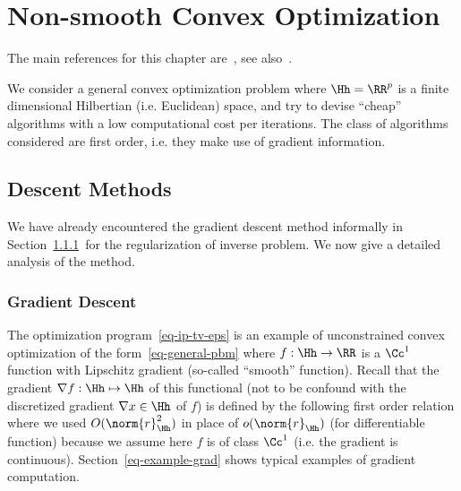
\chapter{Non-smooth Convex Optimization}
\label{chap-conv-duality}

The main references for this chapter are~\cite{chambolle2010introduction,chambolle2016introduction,boyd2004convex}, see also~\cite{parikh2014proximal,boyd2011distributed,beck2014introduction}. 

We consider a general convex optimization problem
where $\Hh=\RR^p$ is a finite dimensional Hilbertian (i.e. Euclidean) space, 
and try to devise ``cheap'' algorithms with a low computational cost per iterations. The class of algorithms considered are first order, i.e. they make use of gradient information. 


\section{Descent Methods}
\label{sec-grad-descent}

We have already encountered the gradient descent method informally in Section~\ref{} for the regularization of inverse problem. We now give a detailed analysis of the method.

\subsection{Gradient Descent}

The optimization program~\eqref{eq-ip-tv-eps} is an example of unconstrained convex optimization of the form~\eqref{eq-general-pbm} where $f : \Hh \rightarrow \RR$ is a $\Cc^1$ function with Lipschitz gradient (so-called ``smooth'' function). Recall that the gradient $\nabla f : \Hh \mapsto \Hh$ of this functional (not to be confound with the discretized gradient $\nabla x \in \Hh$ of $f$) is defined by the following first order relation
where we used $O(\norm{r}_{\Hh}^2)$ in place of $o(\norm{r}_{\Hh})$ (for differentiable function) because we assume here $f$ is of class $\Cc^1$ (i.e. the gradient is continuous). Section~\ref{eq-example-grad} shows typical examples of gradient computation.

